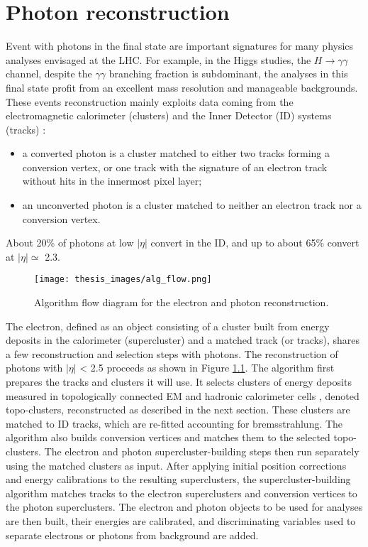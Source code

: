 \documentclass[a4paper, oneside, 11pt, openright]{book}
\begin{document}
	
	\chapter{Photon reconstruction}
		Event with photons in the final state are important signatures for many physics analyses envisaged at the LHC. For example, in the Higgs studies, the $H \to \gamma\gamma$ channel, despite the $\gamma\gamma$ branching fraction is subdominant, the analyses in this final state profit from an excellent mass resolution and manageable backgrounds. These events reconstruction mainly exploits data coming from the electromagnetic calorimeter (clusters) and the Inner Detector (ID) systems (tracks) \cite{Aad_2019}:
		\begin{itemize}
			\item a converted photon is a cluster matched to either two tracks forming a conversion vertex, or one track with the signature of an electron track without hits in the innermost pixel layer;
			\item an unconverted photon is a cluster matched to neither an electron track nor a conversion vertex.
		\end{itemize}
		About 20\% of photons at low $|\eta|$ convert in the ID, and up to about 65\% convert at $|\eta| \simeq$ 2.3. 
		
		\begin{figure}
			\centering
			\texttt{[image: thesis\_images/alg\_flow.png]} 
			\caption{Algorithm flow diagram for the electron and photon reconstruction.}
			\label{fig:alg ph}
		\end{figure}
		
		The electron, defined as an object consisting of a cluster built from energy deposits in the calorimeter (supercluster) and a matched track (or tracks), shares a few reconstruction and selection steps with photons. The reconstruction of photons with $|\eta|$ < 2.5 proceeds as shown in Figure \ref{fig:alg ph}. The algorithm first prepares the tracks and clusters it will use. It selects clusters of energy deposits measured in topologically connected EM and hadronic calorimeter cells \cite{topo_cluster}, denoted topo-clusters, reconstructed as described in the next section. These clusters are matched to ID tracks, which are re-fitted accounting for bremsstrahlung. The algorithm also builds conversion vertices and matches them to the selected topo-clusters. The electron and photon supercluster-building steps then run separately using the matched clusters as input. After applying initial position corrections and energy calibrations to the resulting superclusters, the supercluster-building algorithm matches tracks to the electron superclusters and conversion vertices to the photon superclusters. The electron and photon objects to be used for analyses are then built, their energies are calibrated, and discriminating variables used to separate electrons or photons from background are added.
		
\end{document}
